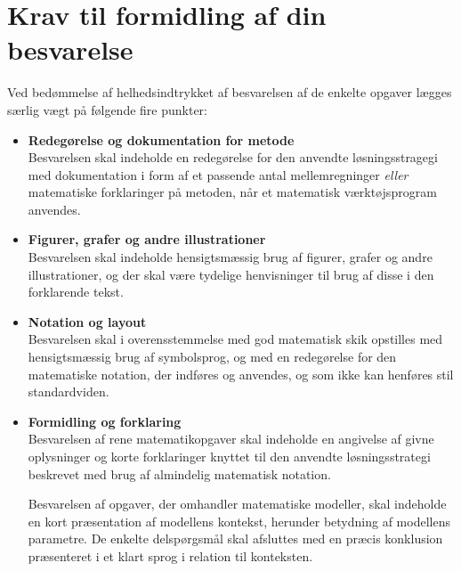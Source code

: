 \documentclass[12pt,x11names,a4paper]{article}
\begin{document}
\section*{Krav til formidling af din besvarelse}

Ved bedømmelse af helhedsindtrykket af besvarelsen af de enkelte opgaver lægges særlig vægt på følgende fire punkter:
\begin{itemize}
\item[$\cdot$] \textbf{Redegørelse og dokumentation for metode} \\
Besvarelsen skal indeholde en redegørelse for den anvendte løsningsstragegi med dokumentation i form af et passende antal mellemregninger \textit{eller} matematiske forklaringer på metoden, når et matematisk værktøjsprogram anvendes.
\item[$\cdot$] \textbf{Figurer, grafer og andre illustrationer} \\
Besvarelsen skal indeholde hensigtsmæssig brug af figurer, grafer og andre illustrationer, og der skal være tydelige henvisninger til brug af disse i den forklarende tekst.
\item[$\cdot$] \textbf{Notation og layout}\\
Besvarelsen skal i overensstemmelse med god matematisk skik opstilles med hensigtsmæssig brug af symbolsprog, og med en redegørelse for den matematiske notation, der indføres og anvendes, og som ikke kan henføres stil standardviden.
\item[$\cdot$] \textbf{Formidling og forklaring}\\
Besvarelsen af rene matematikopgaver skal indeholde en angivelse af givne oplysninger og korte forklaringer knyttet til den anvendte løsningsstrategi beskrevet med brug af almindelig matematisk notation. 

Besvarelsen af opgaver, der omhandler matematiske modeller, skal indeholde en kort præsentation af modellens kontekst, herunder betydning af modellens parametre. De enkelte delspørgsmål skal afsluttes med en præcis konklusion præsenteret i et klart sprog i relation til konteksten.
\end{itemize}
\end{document}
